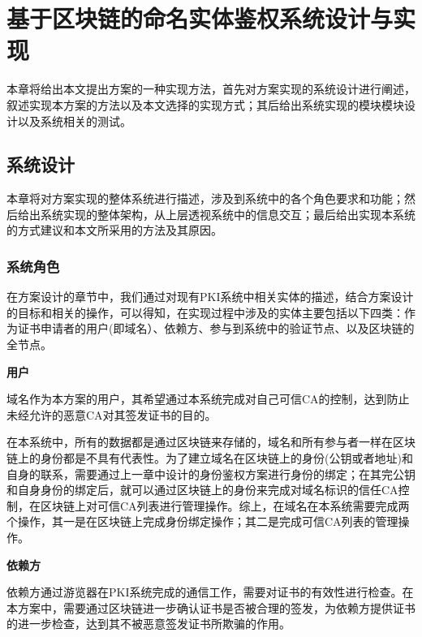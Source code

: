 
\chapter{基于区块链的命名实体鉴权系统设计与实现}

本章将给出本文提出方案的一种实现方法，首先对方案实现的系统设计进行阐述，叙述实现本方案的方法以及本文选择的实现方式；其后给出系统实现的模块模块设计以及系统相关的测试。

\section{系统设计}

本章将对方案实现的整体系统进行描述，涉及到系统中的各个角色要求和功能；然后给出系统实现的整体架构，从上层透视系统中的信息交互；最后给出实现本系统的方式建议和本文所采用的方法及其原因。

\subsection{系统角色}


在方案设计的章节中，我们通过对现有PKI系统中相关实体的描述，结合方案设计的目标和相关的操作，可以得知，在实现过程中涉及的实体主要包括以下四类：作为证书申请者的用户(即域名）、依赖方、参与到系统中的验证节点、以及区块链的全节点。


\noindent\textbf{用户}

域名作为本方案的用户，其希望通过本系统完成对自己可信CA的控制，达到防止未经允许的恶意CA对其签发证书的目的。

在本系统中，所有的数据都是通过区块链来存储的，域名和所有参与者一样在区块链上的身份都是不具有代表性。为了建立域名在区块链上的身份(公钥或者地址)和自身的联系，需要通过上一章中设计的身份鉴权方案进行身份的绑定；在其完公钥和自身身份的绑定后，就可以通过区块链上的身份来完成对域名标识的信任CA控制，在区块链上对可信CA列表进行管理操作。综上，在域名在本系统需要完成两个操作，其一是在区块链上完成身份绑定操作；其二是完成可信CA列表的管理操作。


\noindent\textbf{依赖方}

依赖方通过游览器在PKI系统完成的通信工作，需要对证书的有效性进行检查。在本方案中，需要通过区块链进一步确认证书是否被合理的签发，为依赖方提供证书的进一步检查，达到其不被恶意签发证书所欺骗的作用。

